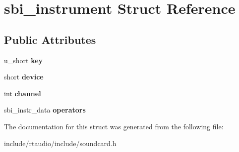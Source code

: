 \hypertarget{structsbi__instrument}{}\section{sbi\+\_\+instrument Struct Reference}
\label{structsbi__instrument}
\subsection*{Public Attributes}
\begin{DoxyCompactItemize}
\item 
u\+\_\+short {\bfseries key}\hypertarget{structsbi__instrument_a097a7bb4c244227f11e75fbdfece5092}{}\label{structsbi__instrument_a097a7bb4c244227f11e75fbdfece5092}

\item 
short {\bfseries device}\hypertarget{structsbi__instrument_aa1e27f500a9fd11b30d61c09414c145b}{}\label{structsbi__instrument_aa1e27f500a9fd11b30d61c09414c145b}

\item 
int {\bfseries channel}\hypertarget{structsbi__instrument_a84884100d575610ceb33a97983e72b9f}{}\label{structsbi__instrument_a84884100d575610ceb33a97983e72b9f}

\item 
sbi\+\_\+instr\+\_\+data {\bfseries operators}\hypertarget{structsbi__instrument_a5472cc9f9ad4489d2b1e962aa9dc5628}{}\label{structsbi__instrument_a5472cc9f9ad4489d2b1e962aa9dc5628}

\end{DoxyCompactItemize}


The documentation for this struct was generated from the following file\+:\begin{DoxyCompactItemize}
\item 
include/rtaudio/include/soundcard.\+h\end{DoxyCompactItemize}
